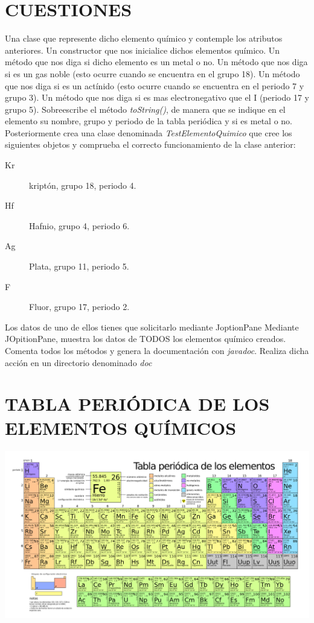 \documentclass[addpoints]{exam}
\begin{document}
\section{CUESTIONES}
\begin{questions}
\question[\half] Una clase que represente dicho elemento químico y contemple los atributos anteriores.
\question[\half]
Un constructor que nos inicialice dichos elementos químico.
\question[\half]
Un método que nos diga si dicho elemento es un metal o no.
\question[\half]
Un método que nos diga si es un gas noble (esto ocurre cuando se encuentra en el grupo 18). 
\question[1]
Un método que nos diga si es un actínido (esto ocurre cuando se encuentra en el periodo 7 y grupo 3).
\question[\half]
Un método que nos diga si es mas electronegativo que el I (periodo 17 y grupo 5).
\question[\half]
Sobreescribe el método \emph{toString()}, de manera que se indique en el elemento su nombre, grupo y periodo de la tabla periódica y si es metal o no.
\question[1]
Posteriormente crea una clase denominada \emph{TestElementoQuimico} que cree los siguientes objetos y comprueba el correcto funcionamiento de la clase anterior:
\\
\begin{description}
\item[Kr] kriptón, grupo 18, periodo 4.
\item[Hf] Hafnio, grupo 4, periodo 6.
\item[Ag] Plata, grupo 11, periodo 5.
\item[F] Fluor, grupo 17, periodo 2.
\end{description}
\question[\half] Los datos de uno de ellos tienes que solicitarlo mediante JoptionPane
\question[1] Mediante JOpitionPane, muestra los datos de TODOS los elementos químico creados.
\question[1\half] Comenta todos los métodos y genera la documentación con \emph{javadoc}. Realiza dicha acción en un directorio denominado \emph{doc}
\newpage
\end{questions}

\section{TABLA PERIÓDICA DE LOS ELEMENTOS QUÍMICOS}

\includegraphics[scale=0.28]{./periodica.png}
\end{document}
